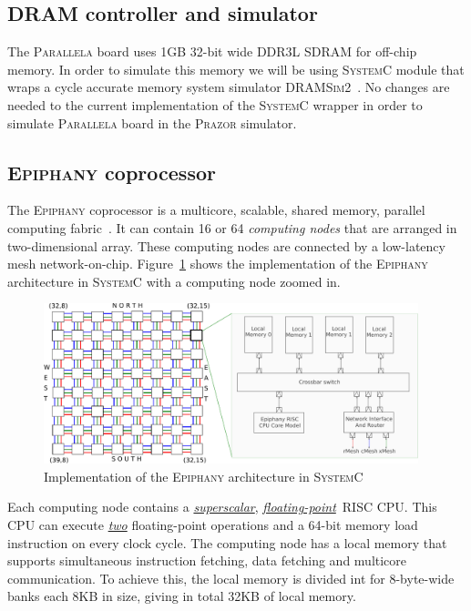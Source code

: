 \documentclass{hitec}
\begin{document}
\subsection{DRAM controller and simulator}
\label{ref:dram}
The \textsc{Parallela} board uses 1GB 32-bit wide DDR3L SDRAM for off-chip
memory. In order to simulate this memory we will be using \textsc{SystemC}
module that wraps a cycle accurate memory system simulator
\textsc{DRAMSim2}~\cite{dramsim2}. No changes are needed to the current
implementation of the \textsc{SystemC} wrapper in order to simulate
\textsc{Parallela} board in the \textsc{Prazor} simulator. 

\subsection{\textsc{Epiphany} coprocessor}
\label{ref:epiphany}
The \textsc{Epiphany} coprocessor is a multicore, scalable, shared memory,
parallel computing fabric~\cite{epiphany}. It can contain 16 or 64 \textit{computing
nodes} that are arranged in two-dimensional array. These computing nodes are
connected by a low-latency mesh network-on-chip. Figure~\ref{fig:epiphany} shows
the implementation of the \textsc{Epiphany} architecture in \textsc{SystemC}
with a computing node zoomed in. 

\begin{figure}
\begin{center}
\includegraphics[width=0.97\textwidth,keepaspectratio=true]{epiphany.pdf}
\end{center}
\caption{Implementation of the \textsc{Epiphany} architecture in \textsc{SystemC}}
\label{fig:epiphany}
\end{figure}

Each computing node contains a \textit{\underline{superscalar}},
\textit{\underline{floating-point}}~\textsc{RISC} CPU. This CPU can execute
\textit{\underline{two}} floating-point operations and a 64-bit memory load
instruction on every clock cycle. The computing node has a local memory that
supports simultaneous instruction fetching, data fetching and multicore
communication. To achieve this, the local memory is divided int for 8-byte-wide
banks each 8KB in size, giving in total 32KB of local memory. 
\end{document}
